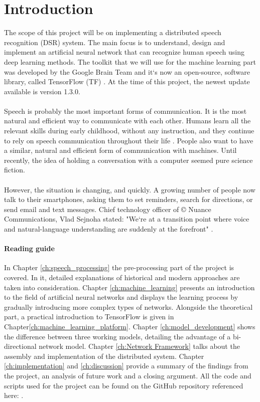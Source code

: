 \chapter{Introduction}\label{ch:introduction}
The scope of this project will be on implementing a distributed speech recognition (DSR) system.
The main focus is to understand, design and implement an artificial neural network that can recognize human speech using deep learning methods.
The toolkit that we will use for the machine learning part was developed by the Google Brain Team and it`s now an open-source, software library, called TensorFlow (TF) \cite{tensorflow2015-whitepaper}.
At the time of this project, the newest update available is version 1.3.0.\\\\
Speech is probably the most important forms of communication.
It is the most natural and efficient way to communicate with
each other. Humans learn all the relevant skills during early
childhood, without any instruction, and they continue to rely
on speech communication throughout their life \cite{kamblespeech}.
People also want to have a similar, natural and efficient form of communication with machines. 
Until recently, the idea of holding a conversation with a computer seemed pure science fiction.\\\\
However, the situation is changing, and quickly.
A growing number of people now talk to their smartphones, asking them to set reminders, search for directions, or send email and text messages.
Chief technology officer of \copyright{} Nuance Communications, Vlad Sejnoha stated: "We`re at a transition point where voice and natural-language understanding are suddenly at the forefront" \cite{kamblespeech}.\\

\subsubsection{Reading guide}
In Chapter \ref{ch:speech_processing} the pre-processing part of the project is covered. In it, detailed explanations of historical and modern approaches are taken into consideration. Chapter \ref{ch:machine_learning} presents an introduction to the field of artificial neural networks and displays the learning process by gradually introducing more complex types of networks. Alongside the theoretical part, a practical introduction to TensorFlow is given in Chapter\ref{ch:machine_learning_platform}. Chapter \ref{ch:model_development} shows the difference between three working models, detailing the advantage of a bi-directional network model. Chapter \ref{ch:Network Framework} talks about the assembly and implementation of the distributed system. Chapter \ref{ch:implementation} and \ref{ch:discussion} provide a summary of the findings from the project, an analysis of future work and a closing argument. All the code and scripts used for the project can be found on the GitHub repository referenced here: \cite{mavericks2017}.
